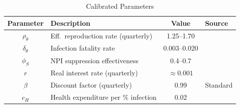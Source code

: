 \documentclass[12pt, a4paper]{article}
\begin{document}
\begin{table}[H]
\centering
\caption{Calibrated Parameters\protect\footnotemark}
\label{tab:calibration}
\scriptsize
\begin{tabular}{@{} c l c l @{}}
\toprule
\textbf{Parameter} & \textbf{Description} & \textbf{Value} & \textbf{Source} \\
\midrule
$\rho_\theta$ & Eff.\ reproduction rate (quarterly)
    & 1.25--1.70
    & \citet{dhungel2022, liu2021rocklov} \\
$\delta_\theta$ & Infection fatality rate
    & 0.003--0.020
    & \citet{IHME2022lancet, Levin2020} \\
$\phi_S$ & NPI suppression effectiveness
    & 0.4--0.7
    & \citet{brauner2021inferring, haug2020ranking} \\
$r$ & Real interest rate (quarterly)
    & $\approx 0.001$
    & \citet{OECD2022borrowing} \\
$\beta$ & Discount factor (quarterly)
    & 0.99
    & Standard \\
$c_H$ & Health expenditure per \% infection
    & 0.02
    & \citet{imf2022fiscalmonitor, OECD2023health} \\
\bottomrule
\end{tabular}
\end{table}
\end{document}
